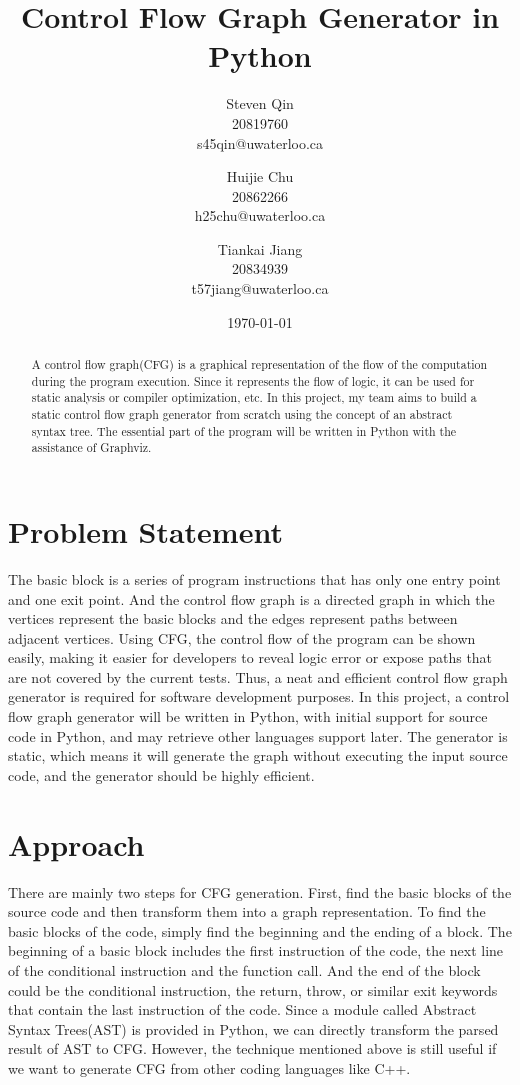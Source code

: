 \documentclass[11pt]{article}
\title{Control Flow Graph Generator in Python}
\author{Steven Qin\\20819760\\s45qin@uwaterloo.ca \and Huijie Chu\\20862266\\h25chu@uwaterloo.ca \and Tiankai Jiang\\20834939\\t57jiang@uwaterloo.ca}
\date{\today}
\begin{document}
\maketitle

\begin{abstract}
A control flow graph(CFG) is a graphical representation of the flow of the computation during the program execution. Since it represents the flow of logic, it can be used for static analysis or compiler optimization, etc. In this project, my team aims to build a static control flow graph generator from scratch using the concept of an abstract syntax tree. The essential part of the program will be written in Python with the assistance of Graphviz.
\end{abstract}

\section{Problem Statement}\label{section-problemStatement}
The basic block is a series of program instructions that has only one entry point and one exit point. And the control flow graph is a directed graph in which the vertices represent the basic blocks and the edges represent paths between adjacent vertices. Using CFG, the control flow of the program can be shown easily, making it easier for developers to reveal logic error or expose paths that are not covered by the current tests. Thus, a neat and efficient control flow graph generator is required for software development purposes. In this project, a control flow graph generator will be written in Python, with initial support for source code in Python, and may retrieve other languages support later. The generator is static, which means it will generate the graph without executing the input source code, and the generator should be highly efficient.

\section{Approach}\label{section-approach}
There are mainly two steps for CFG generation. First, find the basic blocks of the source code and then transform them into a graph representation. To find the basic blocks of the code, simply find the beginning and the ending of a block. The beginning of a basic block includes the first instruction of the code, the next line of the conditional instruction and the function call. And the end of the block could be the conditional instruction, the return, throw, or similar exit keywords that contain the last instruction of the code. Since a module called Abstract Syntax Trees(AST) is provided in Python, we can directly transform the parsed result of AST to CFG. However, the technique mentioned above is still useful if we want to generate CFG from other coding languages like C++.
\end{document}
